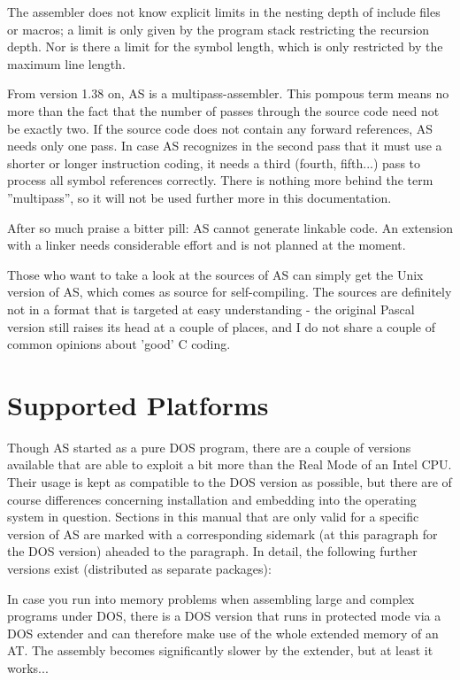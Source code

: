 \documentclass[12pt,twoside]{report}
\newcommand{\asname}{{AS}}
\begin{document}
The assembler does not know explicit limits in the nesting depth of
include files or macros; a limit is only given by the program stack
restricting the recursion depth.  Nor is there a limit for the
symbol length, which is only restricted by the maximum line length.

From version 1.38 on, \asname{} is a multipass-assembler.  This pompous term
means no more than the fact that the number of passes through the
source code need not be exactly two. If the source code does not
contain any forward references, \asname{} needs only one pass.  In case \asname{}
recognizes in the second pass that it must use a shorter or longer
instruction coding, it needs a third (fourth, fifth...) pass to
process all symbol references correctly. There is nothing more behind
the term ''multipass'', so it will not be used further more in this
documentation.

After so much praise a bitter pill: \asname{} cannot generate linkable code.
An extension with a linker needs considerable effort and is not planned
at the moment.

Those who want to take a look at the sources of \asname{} can simply get the
Unix version of \asname{}, which comes as source for self-compiling.  The sources
are definitely not in a format that is targeted at easy understanding -
the original Pascal version still raises its head at a couple of places,
and I do not share a couple of common opinions about 'good' C coding.


\section{Supported Platforms}

Though \asname{} started as a pure DOS  program, there are a
couple of versions available that are able to exploit a bit more than the
Real Mode of an Intel CPU.  Their usage is kept as compatible to the DOS
version as possible, but there are of course differences concerning
installation and embedding into the operating system in question.
Sections in this manual that are only valid for a specific version of \asname{}
are marked with a corresponding sidemark (at this paragraph for the DOS
version) aheaded to the paragraph.  In detail, the following further
versions exist (distributed as separate packages):

In case you run into memory problems when assembling
large and complex programs under DOS, there is a DOS version that runs in
protected mode via a DOS extender and can therefore make use of the whole
extended memory of an AT.  The assembly becomes significantly slower by
the extender, but at least it works...
\end{document}
